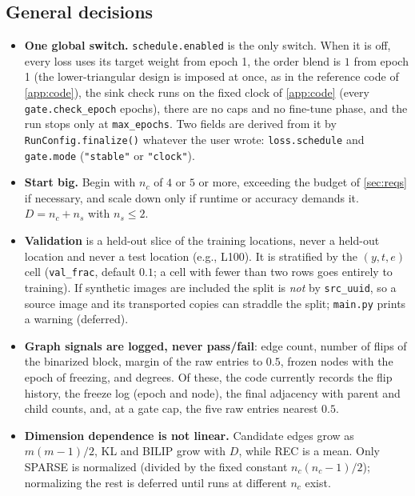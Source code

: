 \subsection{General decisions}
\label{sec:schedule:general}
\begin{itemize}[leftmargin=1.5em]
\item \textbf{One global switch.} \texttt{schedule.enabled} is the only switch. When it
      is off, every loss uses its target weight from epoch 1, the order blend is $1$
      from epoch 1 (the lower-triangular design is imposed at once, as in the
      reference code of \cref{app:code}), the sink check runs on the fixed clock of
      \cref{app:code} (every \texttt{gate.check\_epoch} epochs), there are no caps and
      no fine-tune phase, and the run stops only at \texttt{max\_epochs}. Two fields
      are derived from it by \texttt{RunConfig.finalize()} whatever the user wrote:
      \texttt{loss.schedule} and \texttt{gate.mode} (\texttt{"stable"} or
      \texttt{"clock"}).
\item \textbf{Start big.} Begin with $n_c$ of $4$ or $5$ or more, exceeding the budget
      of \cref{sec:reqs} if necessary, and scale down only if runtime or accuracy
      demands it. $D=n_c+n_s$ with $n_s\le2$.
\item \textbf{Validation} is a held-out slice of the training locations, never a
      held-out location and never a test location (e.g., L100). It is stratified by the $(y,t,e)$ 
      cell (\texttt{val\_frac}, default $0.1$; a cell with fewer than two rows goes
      entirely to training). If synthetic images are included the split is
      \emph{not} by \texttt{src\_uuid}, so a source image and its transported copies
      can straddle the split; \texttt{main.py} prints a warning (deferred).
\item \textbf{Graph signals are logged, never pass/fail}: edge count, number of flips
      of the binarized block, margin of the raw entries to $0.5$, frozen nodes with
      the epoch of freezing, and degrees. Of these, the code currently records the
      flip history, the freeze log (epoch and node), the final adjacency with parent
      and child counts, and, at a gate cap, the five raw entries nearest $0.5$.
\item \textbf{Dimension dependence is not linear.} Candidate edges grow as
      $m(m-1)/2$, KL and BILIP grow with $D$, while REC is a mean. Only SPARSE is
      normalized (divided by the fixed constant $n_c(n_c-1)/2$); normalizing the rest
      is deferred until runs at different $n_c$ exist.

\end{itemize}
